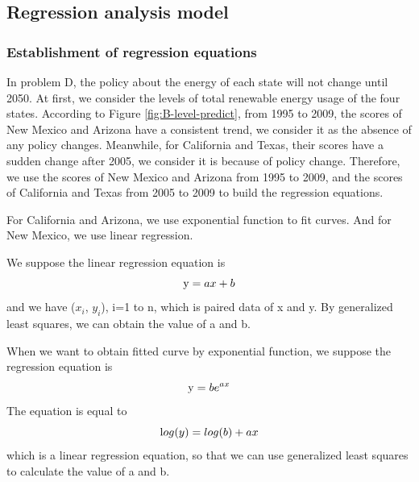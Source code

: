 \documentclass[a4paper,11pt]{article}
\begin{document}
\subsection{Regression analysis model}  
\subsubsection{Establishment of regression equations}
\par In problem D, the policy about the energy of each state will not change until 2050. At first, we consider the levels of total renewable energy usage of the four states.  According to Figure \ref{fig:B-level-predict}, from 1995 to 2009, the scores of New Mexico and Arizona have a consistent trend, we consider it as the absence of any policy changes. Meanwhile, for California and Texas, their scores have a sudden change after 2005, we consider it is because of policy change. Therefore, we use the scores of New Mexico and Arizona from 1995 to 2009, and the scores  of California and Texas from 2005 to 2009 to build the regression equations.
\par For California and Arizona, we use exponential function to fit curves. And for New Mexico, we use linear regression.
\par We suppose the linear regression equation is
\begin{equation}
    \centering
\text   y=ax+b
\end{equation}
and we have ($x_i$, $y_i$), i=1 to n, which is paired data of x and y. By generalized least squares, we can obtain the value of a and b.
\par When we want to obtain fitted curve by exponential function, we suppose the regression equation is
\begin{equation}
    \centering
\text   y=be^{ax}
\end{equation}
The equation is equal to
\begin{equation}
    \centering
\text   log(y)=log(b)+ax
\end{equation}
which is a linear regression equation, so that we can use generalized least squares to calculate the value of a and b.
\end{document}
